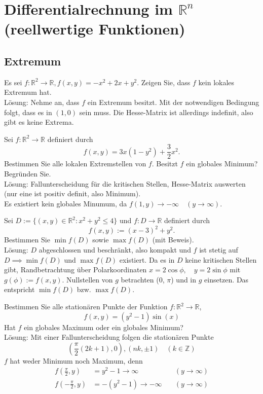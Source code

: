 \section{Differentialrechnung im $\mathbb{R}^n$ (reellwertige Funktionen)}
\subsection{Extremum}
Es sei $f : \mathbb{R}^2 \to \mathbb{R}, f(x,y) = -x^2 + 2x + y^2$.
Zeigen Sie, dass $f$ kein lokales Extremum hat.\\
Lösung:
Nehme an, dass $f$ ein Extremum besitzt.
Mit der notwendigen Bedingung folgt, dass es in $(1,0)$ sein muss.
Die Hesse-Matrix ist allerdings indefinit, also gibt es keine Extrema.

Sei $f : \mathbb{R}^2 \to \mathbb{R}$ definiert durch
\begin{displaymath}
  f(x,y) = 3x(1 - y^2) + \frac{3}{2}x^2.
\end{displaymath}
Bestimmen Sie alle lokalen Extremstellen von $f$.
Besitzt $f$ ein globales Minimum?
Begründen Sie.\\
Lösung:
Fallunterscheidung für die kritischen Stellen, Hesse-Matrix auswerten (nur eine ist positiv definit, also Minimum).\\
Es existiert kein globales Minumum, da $f(1,y) \to -\infty \quad (y \to \infty)$.

Sei $D := \{(x,y) \in \mathbb{R}^2 : x^2 + y^2 \leq 4\}$ und $f : D \to \mathbb{R}$ definiert durch
\begin{displaymath}
  f(x,y) := (x - 3)^2 + y^2.
\end{displaymath}
Bestimmen Sie $\min f(D)$ sowie $\max f(D)$ (mit Beweis).\\
Lösung:
$D$ abgeschlossen und beschränkt, also kompakt und $f$ ist stetig auf $D \implies \min f(D)$ und $\max f(D)$ existiert.
Da es in $D$ keine kritischen Stellen gibt, Randbetrachtung über Polarkoordinaten $x = 2 \cos \phi, \quad y = 2 \sin \phi$ mit $g(\phi) := f(x,y)$.
Nullstellen von $g$ betrachten ($0$, $\pi$) und in $g$ einsetzen.
Das entspricht $\min f(D)$ bzw. $\max f(D)$.

Bestimmen Sie alle stationären Punkte der Funktion $f : \mathbb{R}^2 \to \mathbb{R}$,
\begin{displaymath}
  f(x,y) = (y^2 - 1) \sin(x)
\end{displaymath}
Hat $f$ ein globales Maximum oder ein globales Minimum?\\
Lösung:
Mit einer Fallunterscheidung folgen die stationären Punkte
\begin{displaymath}
  \left(\frac{\pi}{2}\left(2k + 1\right), 0\right), (nk, \pm 1) \quad (k \in \mathbb{Z})
\end{displaymath}
$f$ hat weder Minimum noch Maximum, denn
\begin{align*}
  f\left(\frac{\pi}{2}, y\right) &= y^2 - 1 \to \infty &\quad (y \to \infty)\\
  f\left(-\frac{\pi}{2}, y\right) &= -(y^2 - 1) \to -\infty &\quad (y \to \infty)
\end{align*}

